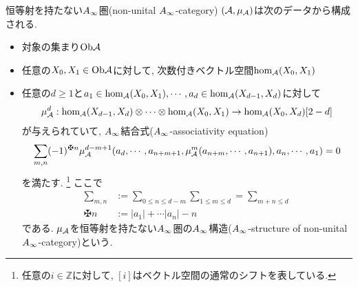 \documentclass[uplatex, a4paper, 14Q, dvipdfmx]{jsarticle}
\begin{document}
\begin{definition} \label{def_non_unital_Ainf_cat}
  恒等射を持たない$A_{\infty}$圏(non-unital $A_{\infty}$-category) $(\mathcal{A},\mu_{\mathcal{A}})$は次のデータから構成される. 
  \begin{itemize}
    \item 対象の集まり$\mathrm{Ob}\mathcal{A}$ 
    \item 任意の$X_0, X_1 \in \mathrm{Ob}\mathcal{A}$に対して, 次数付きベクトル空間$\hom_{\mathcal{A}}(X_0,X_1)$
    \item 任意の$d \geq 1$と$a_1 \in \hom_{\mathcal{A}}(X_0,X_1), \cdots, a_d \in \hom_{\mathcal{A}}(X_{d-1},X_d)$に対して
    \begin{align*}
      \mu^d_{\mathcal{A}} : \hom_{\mathcal{A}}(X_{d-1},X_d) \otimes \cdots \otimes \hom_{\mathcal{A}}(X_0,X_1) \to \hom_{\mathcal{A}}(X_0,X_d)[2-d]
    \end{align*}
    が与えられていて, $A_{\infty}$結合式($A_{\infty}$-associativity equation) 
    \begin{align*}
      \sum_{m,n} (-1)^{\maltese n} \mu^{d-m+1}_\A(a_d,\cdots,a_{n+m+1}, \mu^m_\A(a_{n+m},\cdots,a_{n+1}), a_n,\cdots,a_1)
      = 0
    \end{align*}
    を満たす.
    \footnote{
      任意の$i \in \mathbb{Z}$に対して, $[i]$はベクトル空間の通常のシフトを表している.
    }
    ここで
    \begin{align*}
      \sum_{m,n} &:= \sum_{0 \leq n \leq d-m} \sum_{1 \leq m \leq d} = \sum_{m+n \leq d} \\
      \maltese n &:= |a_1| + \cdots |a_n| - n
    \end{align*}
    である. 
    $\mu_{\mathcal{A}}$を恒等射を持たない$A_{\infty}$圏の$A_{\infty}$構造($A_{\infty}$-structure of non-unital $A_{\infty}$-category)という. 
  \end{itemize}
\end{definition}
\end{document}
